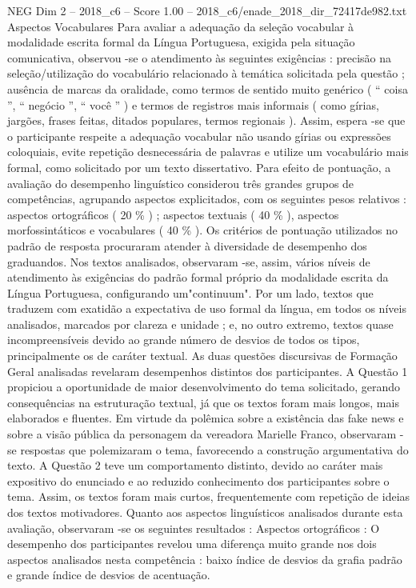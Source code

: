 \begin{textsample}{NEG Dim 2 – 2018\_c6 – Score 1.00 – 2018\_c6/enade\_2018\_dir\_72417de982.txt}
Aspectos Vocabulares Para avaliar a adequação da seleção vocabular à modalidade escrita formal da Língua Portuguesa, exigida pela situação comunicativa, observou -se o atendimento às seguintes exigências : precisão na seleção/utilização do vocabulário relacionado à temática solicitada pela questão ; ausência de marcas da oralidade, como termos de sentido muito genérico ( “ coisa ”, “ negócio ”, “ você ” ) e termos de registros mais informais ( como gírias, jargões, frases feitas, ditados populares, termos regionais ).
Assim, espera -se que o participante respeite a adequação vocabular não usando gírias ou expressões coloquiais, evite repetição desnecessária de palavras e utilize um vocabulário mais formal, como solicitado por um texto dissertativo.
Para efeito de pontuação, a avaliação do desempenho linguístico considerou três grandes grupos de competências, agrupando aspectos explicitados, com os seguintes pesos relativos : aspectos ortográficos ( 20 \% ) ; aspectos textuais ( 40 \% ), aspectos morfossintáticos e vocabulares ( 40 \% ).
Os critérios de pontuação utilizados no padrão de resposta procuraram atender à diversidade de desempenho dos graduandos.
Nos textos analisados, observaram -se, assim, vários níveis de atendimento às exigências do padrão formal próprio da modalidade escrita da Língua Portuguesa, configurando um"continuum".
Por um lado, textos que traduzem com exatidão a expectativa de uso formal da língua, em todos os níveis analisados, marcados por clareza e unidade ; e, no outro extremo, textos quase incompreensíveis devido ao grande número de desvios de todos os tipos, principalmente os de caráter textual.
As duas questões discursivas de Formação Geral analisadas revelaram desempenhos distintos dos participantes.
A Questão 1 propiciou a oportunidade de maior desenvolvimento do tema solicitado, gerando consequências na estruturação textual, já que os textos foram mais longos, mais elaborados e fluentes.
Em virtude da polêmica sobre a existência das fake news e sobre a visão pública da personagem da vereadora Marielle Franco, observaram -se respostas que polemizaram o tema, favorecendo a construção argumentativa do texto.
A Questão 2 teve um comportamento distinto, devido ao caráter mais expositivo do enunciado e ao reduzido conhecimento dos participantes sobre o tema.
Assim, os textos foram mais curtos, frequentemente com repetição de ideias dos textos motivadores.
Quanto aos aspectos linguísticos analisados durante esta avaliação, observaram -se os seguintes resultados : Aspectos ortográficos : O desempenho dos participantes revelou uma diferença muito grande nos dois aspectos analisados nesta competência : baixo índice de desvios da grafia padrão e grande índice de desvios de acentuação.

\end{textsample}
